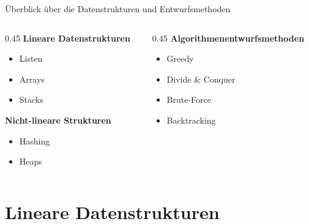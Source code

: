 \documentclass[aspectratio=169,xcolor=dvipsnames, t]{beamer}
\begin{document}
\begin{frame}{Überblick über die Datenstrukturen und Entwurfsmethoden}
	\begin{columns}
		\begin{column}{0.45\textwidth}
			\textbf{\Large Lineare Datenstrukturen}
			\begin{itemize}
				\item Listen
				\item Arrays
				\item Stacks
			\end{itemize}

			\vspace{0.5cm}
			\textbf{\Large Nicht-lineare Strukturen}
			\begin{itemize}
				\item Hashing
                \item Heaps
			\end{itemize}
		\end{column}

		\begin{column}{0.45\textwidth}
			\textbf{\Large Algorithmenentwurfsmethoden}
			\begin{itemize}
				\item Greedy
				\item Divide \& Conquer
				\item Brute-Force
				\item Backtracking
			\end{itemize}
		\end{column}
	\end{columns}
\end{frame}

\section{Lineare Datenstrukturen}
\end{document}
